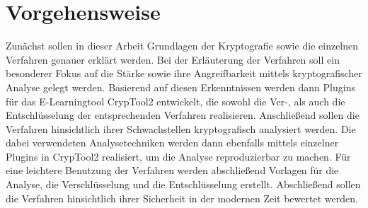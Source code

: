 \documentclass[fontsize=11pt, paper=a4, parskip=half]{scrartcl}
\begin{document}
\section{Vorgehensweise}
Zunächst sollen in dieser Arbeit Grundlagen der Kryptografie sowie die einzelnen Verfahren genauer erklärt werden. Bei der Erläuterung der Verfahren soll ein besonderer Fokus auf die Stärke sowie ihre Angreifbarkeit mittels kryptografischer Analyse gelegt werden. Basierend auf diesen Erkenntnissen werden dann Plugins für das E-Learningtool CrypTool2 entwickelt, die sowohl die Ver-, als auch die Entschlüsselung der entsprechenden Verfahren realisieren. Anschließend sollen die Verfahren hinsichtlich ihrer Schwachstellen kryptografisch analysiert werden. Die dabei verwendeten Analysetechniken werden dann ebenfalls mittels einzelner Plugins in CrypTool2 realisiert, um die Analyse reproduzierbar zu machen. Für eine leichtere Benutzung der Verfahren werden abschließend Vorlagen für die Analyse, die Verschlüsselung und die Entschlüsselung erstellt. Abschließend sollen die Verfahren hinsichtlich ihrer Sicherheit in der modernen Zeit bewertet werden.

\newpage
\end{document}
